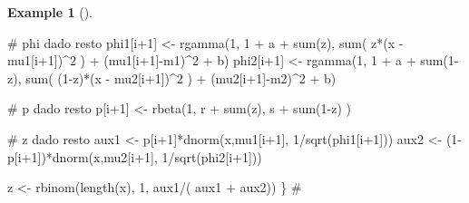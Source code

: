 \documentclass[
  letterpaper,
  DIV=11,
  numbers=noendperiod]{scrreprt}
\newenvironment{Shaded}{\begin{snugshade}}{\end{snugshade}}
\newcommand{\CommentTok}[1]{\textcolor[rgb]{0.37,0.37,0.37}{#1}}
\newcommand{\DecValTok}[1]{\textcolor[rgb]{0.68,0.00,0.00}{#1}}
\newcommand{\FunctionTok}[1]{\textcolor[rgb]{0.28,0.35,0.67}{#1}}
\newcommand{\NormalTok}[1]{\textcolor[rgb]{0.00,0.23,0.31}{#1}}
\newcommand{\OtherTok}[1]{\textcolor[rgb]{0.00,0.23,0.31}{#1}}
\newcommand{\SpecialCharTok}[1]{\textcolor[rgb]{0.37,0.37,0.37}{#1}}
\theoremstyle{definition}
\theoremstyle{plain}
\theoremstyle{definition}
\newtheorem{example}{Example}[chapter]
\theoremstyle{remark}
\begin{document}
\begin{example}[]
\begin{Shaded}
\begin{Highlighting}[]
  \CommentTok{\# phi dado resto}
\NormalTok{  phi1[i}\SpecialCharTok{+}\DecValTok{1}\NormalTok{] }\OtherTok{\textless{}{-}} \FunctionTok{rgamma}\NormalTok{(}\DecValTok{1}\NormalTok{, }\DecValTok{1} \SpecialCharTok{+}\NormalTok{ a }\SpecialCharTok{+} \FunctionTok{sum}\NormalTok{(z), }\FunctionTok{sum}\NormalTok{( z}\SpecialCharTok{*}\NormalTok{(x }\SpecialCharTok{{-}}\NormalTok{ mu1[i}\SpecialCharTok{+}\DecValTok{1}\NormalTok{])}\SpecialCharTok{\^{}}\DecValTok{2}\NormalTok{ ) }\SpecialCharTok{+}\NormalTok{ (mu1[i}\SpecialCharTok{+}\DecValTok{1}\NormalTok{]}\SpecialCharTok{{-}}\NormalTok{m1)}\SpecialCharTok{\^{}}\DecValTok{2} \SpecialCharTok{+}\NormalTok{ b)}
\NormalTok{  phi2[i}\SpecialCharTok{+}\DecValTok{1}\NormalTok{] }\OtherTok{\textless{}{-}} \FunctionTok{rgamma}\NormalTok{(}\DecValTok{1}\NormalTok{, }\DecValTok{1} \SpecialCharTok{+}\NormalTok{ a }\SpecialCharTok{+} \FunctionTok{sum}\NormalTok{(}\DecValTok{1}\SpecialCharTok{{-}}\NormalTok{z), }\FunctionTok{sum}\NormalTok{( (}\DecValTok{1}\SpecialCharTok{{-}}\NormalTok{z)}\SpecialCharTok{*}\NormalTok{(x }\SpecialCharTok{{-}}\NormalTok{ mu2[i}\SpecialCharTok{+}\DecValTok{1}\NormalTok{])}\SpecialCharTok{\^{}}\DecValTok{2}\NormalTok{ ) }\SpecialCharTok{+}\NormalTok{ (mu2[i}\SpecialCharTok{+}\DecValTok{1}\NormalTok{]}\SpecialCharTok{{-}}\NormalTok{m2)}\SpecialCharTok{\^{}}\DecValTok{2} \SpecialCharTok{+}\NormalTok{ b)}
  
  \CommentTok{\# p dado resto}
\NormalTok{  p[i}\SpecialCharTok{+}\DecValTok{1}\NormalTok{] }\OtherTok{\textless{}{-}} \FunctionTok{rbeta}\NormalTok{(}\DecValTok{1}\NormalTok{, r }\SpecialCharTok{+} \FunctionTok{sum}\NormalTok{(z), s }\SpecialCharTok{+} \FunctionTok{sum}\NormalTok{(}\DecValTok{1}\SpecialCharTok{{-}}\NormalTok{z) )}
  
  \CommentTok{\# z dado resto}
\NormalTok{  aux1 }\OtherTok{\textless{}{-}}\NormalTok{ p[i}\SpecialCharTok{+}\DecValTok{1}\NormalTok{]}\SpecialCharTok{*}\FunctionTok{dnorm}\NormalTok{(x,mu1[i}\SpecialCharTok{+}\DecValTok{1}\NormalTok{], }\DecValTok{1}\SpecialCharTok{/}\FunctionTok{sqrt}\NormalTok{(phi1[i}\SpecialCharTok{+}\DecValTok{1}\NormalTok{]))}
\NormalTok{  aux2 }\OtherTok{\textless{}{-}}\NormalTok{ (}\DecValTok{1}\SpecialCharTok{{-}}\NormalTok{p[i}\SpecialCharTok{+}\DecValTok{1}\NormalTok{])}\SpecialCharTok{*}\FunctionTok{dnorm}\NormalTok{(x,mu2[i}\SpecialCharTok{+}\DecValTok{1}\NormalTok{], }\DecValTok{1}\SpecialCharTok{/}\FunctionTok{sqrt}\NormalTok{(phi2[i}\SpecialCharTok{+}\DecValTok{1}\NormalTok{]))}
  
\NormalTok{  z }\OtherTok{\textless{}{-}} \FunctionTok{rbinom}\NormalTok{(}\FunctionTok{length}\NormalTok{(x), }\DecValTok{1}\NormalTok{, aux1}\SpecialCharTok{/}\NormalTok{( aux1 }\SpecialCharTok{+}\NormalTok{ aux2))}
\NormalTok{\}}
\CommentTok{\# }
\end{Highlighting}
\end{Shaded}


\end{example}
\end{document}
